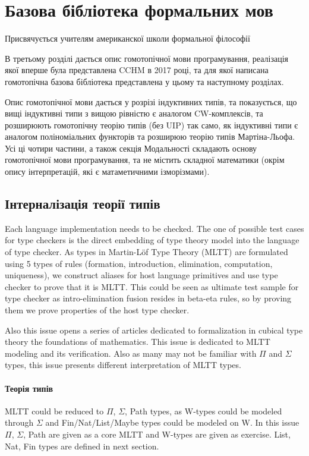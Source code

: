 \chapter{Базова бібліотека формальних мов}
\epigraph{Присвячується учителям американскої школи формальної філософії}{}

В третьому розділі дається опис гомотопічної мови програмування,
реалізація якої вперше була представлена CCHM в 2017 році, та для якої написана
гомотопічна базова бібліотека представлена у цьому та наступному розділах.

Опис гомотопічної мови дається у розрізі індуктивних типів, та показується,
що вищі індуктивні типи з вищою рівністю є аналогом CW-комплексів, та розширюють
гомотопічну теорію типів (без UIP) так само, як індуктивні типи є аналогом
поліноміальних функторів та розширюю теорію типів Мартіна-Льофа. Усі ці чотири
частини, а також секція Модальності складають основу гомотопічної мови програмування,
та не містить складної математики (окрім опису інтерпретацій,
які є матаметичними ізморізмами).

\section{Інтерналізація теорії типів}

Each language implementation needs to be checked. The one of possible test cases
for type checkers is the direct embedding of type theory model into the language of type checker.
As types in Martin-Löf Type Theory (MLTT) are formulated using 5 types of rules (formation,
introduction, elimination, computation, uniqueness), we construct aliases
for host language primitives and use type checker to prove that it is MLTT.
This could be seen as ultimate test sample for type checker as
intro-elimination fusion resides in beta-eta rules, so by proving them
we prove properties of the host type checker.

Also this issue opens a series of articles dedicated to formalization in
cubical type theory the foundations of mathematics. This issue is dedicated
to MLTT modeling and its verification. Also as many may not be familiar with
$\Pi$ and $\Sigma$ types, this issue presents different interpretation of MLTT types.

\subsubsection{Теорія типів}

MLTT could be reduced to $\Pi$, $\Sigma$, Path types, as W-types could be
modeled through $\Sigma$ and Fin/Nat/List/Maybe types could be modeled on W.
In this issue $\Pi$, $\Sigma$, Path are given as a core MLTT and W-types
are given as exercise. List, Nat, Fin types are defined in
next section.

